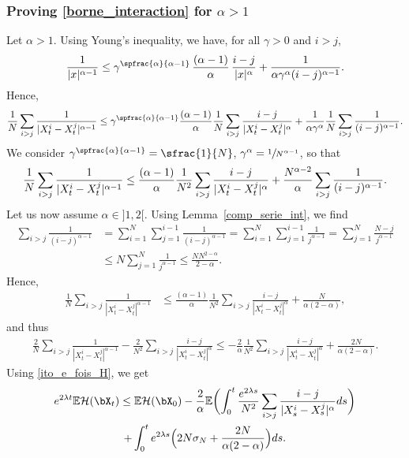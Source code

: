 \subsubsection*{Proving \eqref{borne_interaction} for $\alpha>1$} Let $\alpha>1$. Using Young's inequality, we have, for all $\gamma>0$ and $i>j$,
\begin{align*}
\frac{1}{|x|^{\alpha-1}}\leq\gamma^{\spfrac{\alpha}{\alpha-1}}\,\frac{(\alpha-1)}{\alpha}\,\frac{i-j}{|x|^{\alpha}}+\frac{1}{\alpha\gamma^\alpha(i-j)^{\alpha-1}}.
\end{align*}
Hence,
\begin{align*}
\frac{1}{N}\sum_{i>j}\frac{1}{|X^i_t-X^j_t|^{\alpha-1}}\leq \gamma^{\spfrac{\alpha}{\alpha-1}}\frac{(\alpha-1)}{\alpha}\frac{1}{N}\sum_{i>j}\frac{i-j}{|X^i_t-X^j_t|^{\alpha}}+\frac{1}{\alpha\gamma^\alpha}\frac{1}{N}\sum_{i>j}\frac{1}{(i-j)^{\alpha-1}}.
\end{align*}
We consider $\gamma^{\spfrac{\alpha}{\alpha-1}}=\sfrac{1}{N}$, \ie $\gamma^{\alpha}=\sfrac{1}{N^{\alpha-1}}$, so that
\begin{equation}\label{controle_serie}
\frac{1}{N}\sum_{i>j}\frac{1}{|X^i_t-X^j_t|^{\alpha-1}}\leq\frac{(\alpha-1)}{\alpha}\frac{1}{N^2}\sum_{i>j}\frac{i-j}{|X^i_t-X^j_t|^{\alpha}}+\frac{N^{\alpha-2}}{\alpha}\sum_{i>j}\frac{1}{(i-j)^{\alpha-1}}.\\
\end{equation}
Let us now assume $\alpha\in{}]1,2[$. Using Lemma~\ref{comp_serie_int}, we find
\begin{align*}
\sum_{i>j}\frac{1}{(i-j)^{\alpha-1}}&=\sum_{i=1}^N\sum_{j=1}^{i-1}\frac{1}{(i-j)^{\alpha-1}}=\sum_{i=1}^N\sum_{j=1}^{i-1}\frac{1}{j^{\alpha-1}}=\sum_{j=1}^N\frac{N-j}{j^{\alpha-1}}\\
&\leq N\sum_{j=1}^N\frac{1}{j^{\alpha-1}}\leq \frac{NN^{2-\alpha}}{2-\alpha}.
\end{align*}
Hence,
\begin{align*}
\frac{1}{N}\sum_{i>j}\frac{1}{|X^i_t-X^j_t|^{\alpha-1}}&\leq \frac{(\alpha-1)}{\alpha}\frac{1}{N^2}\sum_{i>j}\frac{i-j}{|X^i_t-X^j_t|^{\alpha}}+\frac{N}{\alpha(2-\alpha)},
\end{align*}
and thus
\begin{align*}
\frac{2}{N}\sum_{i>j}\frac{1}{|X^i_t-X^j_t|^{\alpha-1}}-\frac{2}{N^2}\sum_{i>j}\frac{i-j}{|X^i_t-X^j_t|^{\alpha}}\leq -\frac{2}{\alpha}\frac{1}{N^2}\sum_{i>j}\frac{i-j}{|X^i_t-X^j_t|^{\alpha}}+\frac{2N}{\alpha(2-\alpha)}.
\end{align*}
Using \eqref{ito_e_fois_H}, we get
\begin{multline}\label{gronwall_H}
e^{2\lambda t}\mathbb{E}\mathcal{H}(\bX_t)\leq \mathbb{E}\mathcal{H}(\bX_0)-\frac{2}{\alpha}\mathbb{E}\biggl(\int_0^t\frac{e^{2\lambda s}}{N^2}\sum_{i>j}\frac{i-j}{|X^i_s-X^j_s|^{\alpha}}ds\biggr)\\
+\int_0^te^{2\lambda s}\Bigl(2N\sigma_N+\frac{2N}{\alpha(2-\alpha)}\Bigr)ds.
\end{multline}
